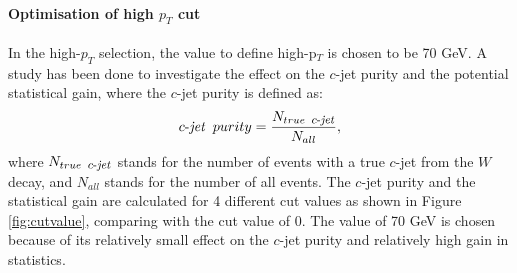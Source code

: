\documentclass[letterpaper,12pt]{article}
\newcommand\cjetineq{\mathop{\mbox{$c$-$\mathit{jet}$}}}
\newcommand\cjetunder{\mathop{\footnotesize{\mbox{$c$-$\mathit{jet}$}}}\normalsize}
\begin{document}
\paragraph{Optimisation of high $p_{T}$ cut}
\label{cutvalue}

In the high-$p_{T}$ selection, the value to define high-p$_{T}$ is 
chosen to be 70 GeV. A study has been done to investigate the effect 
on the $c$-jet purity and the potential statistical gain, where the $c$-jet purity is defined as:
\begin{equation}
\cjetineq\ purity = \frac{N_{true\ \cjetunder}}{N_{all}},
\end{equation}
where $N_{true\ \cjetunder}$ stands for the number of events with a 
true $c$-jet from the $W$ decay, and $N_{all}$ stands for the number of all events. 
The $c$-jet purity and the statistical gain are calculated for 4 different cut 
values as shown in Figure \ref{fig:cutvalue}, comparing with the cut value of 0. 
The value of 70 GeV is chosen because of its relatively small effect on the $c$-jet 
purity and relatively high gain in statistics. 
\end{document}
